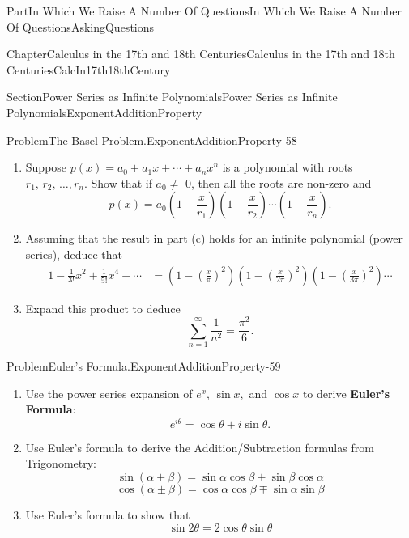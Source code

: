 \documentclass[oneside,10pt,]{book}
\newcommand{\terminology}[1]{\textbf{#1}}
\numberwithin{equation}{part}
\newcommand{\amp}{&}
\begin{document}
\begin{partptx}{Part}{In Which We Raise A Number Of Questions}{}{In Which We Raise A Number Of Questions}{}{}{AskingQuestions}
\begin{chapterptx}{Chapter}{Calculus in the 17th and 18th Centuries}{}{Calculus in the 17th and 18th Centuries}{}{}{CalcIn17th18thCentury}
\begin{sectionptx}{Section}{Power Series as Infinite Polynomials}{}{Power Series as Infinite Polynomials}{}{}{ExponentAdditionProperty}
\begin{problem}{Problem}{The Basel Problem.}{ExponentAdditionProperty-58}
\begin{enumerate}[font=\bfseries,label=(\alph*),ref=\alph*]
\begin{equation*}
x=\pm\pi,\,\pm 2\pi,\,\pm 3\pi,\,\ldots
\end{equation*}
%
\item{}Suppose \(p(x)=a_0+a_1x+\cdots+a_nx^n\) is a polynomial with roots \(r_1,\,r_2,\,\ldots,r_n\). Show that if \(a_0\neq\) \(0\), then all the roots are non-zero and%
\begin{equation*}
p(x)=a_0\left(1-\frac{x}{r_1}\right)\left(1-\frac{x}{r_2}\right)\cdots\left(1-\frac{x}{r_n}\right)\text{.}
\end{equation*}
%
\item{}Assuming that the result in part (c) holds for an infinite polynomial (power series), deduce that%
\begin{align*}
1-\frac{1}{3!}x^2+\frac{1}{5!}x^4-\cdots\amp =\left(1-\left(\frac{x}{\pi}\right)^2\right)\left(1-\left(\frac{x}{2\pi}\right)^2\right)\left(1-\left(\frac{x}{3\pi}\right)^2\right)\cdots
\end{align*}
%
\item{}Expand this product to deduce%
\begin{equation*}
\sum_{n=1}^\infty\frac{1}{n^2}=\frac{\pi^2}{6}.{}
\end{equation*}
%
\end{enumerate}%
\end{problem}
\begin{problem}{Problem}{Euler's Formula.}{ExponentAdditionProperty-59}%
\begin{enumerate}[font=\bfseries,label=(\alph*),ref=\alph*]%
\item{}Use the power series expansion of \(e^x\), \(\sin
x,\) and \(\cos x\) to derive \terminology{Euler's Formula}:%
\begin{equation*}
e^{i\theta} = \cos\theta+i\sin\theta.
\end{equation*}
%
\item{}Use Euler's formula to derive the Addition\slash{}Subtraction formulas from Trigonometry:%
\begin{equation*}
\sin(\alpha\pm\beta) = \sin\alpha\cos\beta\pm\sin\beta\cos\alpha
\end{equation*}
%
\begin{equation*}
\cos(\alpha\pm\beta) = \cos\alpha\cos\beta\mp\sin\alpha\sin\beta
\end{equation*}
%
\item{}Use Euler's formula to show that%
\begin{equation*}
\sin 2\theta = 2\cos\theta\sin\theta
\end{equation*}
%
\begin{equation*}

\end{equation*}
\end{enumerate}
\end{problem}
\end{sectionptx}
\end{chapterptx}
\end{partptx}
\end{document}
